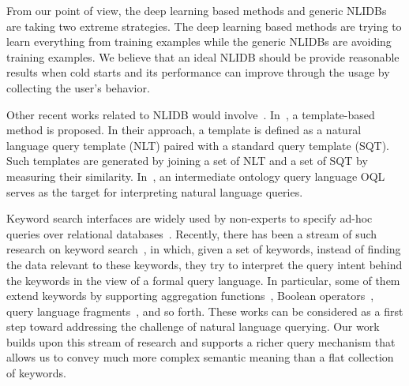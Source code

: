 \documentclass{vldb}
\begin{document}
From our point of view, the deep learning based methods and generic NLIDBs are taking two extreme strategies.  The deep learning based methods are trying to learn everything from training examples while the generic NLIDBs are avoiding training examples.  We believe that an ideal NLIDB should be provide reasonable results when cold starts and its performance can improve through the usage by collecting the user's behavior.  

Other recent works related to NLIDB would involve~\cite{DBLP:conf/sigmod/ZhengZLYSZ15,DBLP:journals/pvldb/SahaFSMMO16}. In~\cite{DBLP:conf/sigmod/ZhengZLYSZ15}, a template-based method is proposed.  In their approach, a template is defined as a natural language query template (NLT) paired with a standard query template (SQT).  Such templates are generated by joining a set of NLT and a set of SQT by measuring their similarity.   In~\cite{DBLP:journals/pvldb/SahaFSMMO16}, an intermediate ontology query language OQL serves as the target for interpreting natural language queries.  

Keyword search interfaces are widely used by non-experts to specify ad-hoc queries over relational databases~\cite{DBLP:series/synthesis/2010Yu,DBLP:conf/icde/BhalotiaHNCS02,DBLP:conf/icde/AgrawalCD02,DBLP:conf/vldb/HristidisP02}. Recently, there has been a stream of such research on keyword search~\cite{DBLP:conf/sigmod/TataL08,DBLP:journals/vldb/SimitsisKI08,DBLP:conf/sigmod/ChuBCDN09,DBLP:journals/pvldb/XinHG10,DBLP:conf/icde/FanLZ11,DBLP:journals/pvldb/BlunschiJKMS12,DBLP:journals/pvldb/BergamaschiGILV13}, in which, given a set of keywords, instead of finding the data relevant to these keywords, they try to interpret the query intent behind the keywords in the view of a formal query language. In particular, some of them extend keywords by supporting aggregation functions~\cite{DBLP:conf/sigmod/TataL08}, Boolean operators~\cite{DBLP:journals/vldb/SimitsisKI08}, query language fragments~\cite{DBLP:journals/pvldb/BlunschiJKMS12}, and so forth. These works can be considered as a first step toward addressing the challenge of natural language querying. Our work builds upon this stream of research and supports a richer query mechanism that allows us to convey much more complex semantic meaning than a flat collection of keywords.
\end{document}
